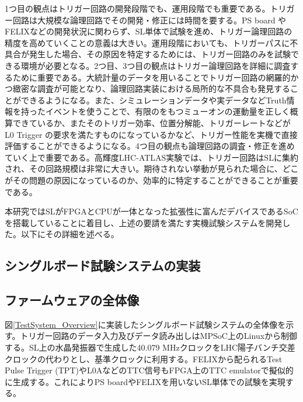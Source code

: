 1つ目の観点はトリガー回路の開発段階でも、運用段階でも重要である。トリガー回路は大規模な論理回路でその開発・修正には時間を要する。PS board や FELIXなどの開発状況に関わらず、SL単体で試験を進め、トリガー論理回路の精度を高めていくことの意義は大きい。運用段階においても、トリガーパスに不具合が発生した場合、その原因を特定するためには、トリガー回路のみを試験できる環境が必要となる。2つ目、3つ目の観点はトリガー論理回路を詳細に調査するために重要である。大統計量のデータを用いることでトリガー回路の網羅的かつ緻密な調査が可能となり、論理回路実装における局所的な不具合も発見することができるようになる。また、シミュレーションデータや実データなどTruth情報を持ったイベントを使うことで、有限の\pt をもつミューオンの運動量を正しく概算できているか、またそのトリガー効率、位置分解能、トリガーレートなどがL0 Trigger の要求を満たすものになっているかなど、トリガー性能を実機で直接評価することができるようになる。4つ目の観点も論理回路の調査・修正を進めていく上で重要である。高輝度LHC-ATLAS実験では、トリガー回路はSLに集約され、その回路規模は非常に大きい。期待されない挙動が見られた場合に、どこがその問題の原因になっているのか、効率的に特定することができることが重要である。

本研究ではSLがFPGAとCPUが一体となった拡張性に富んだデバイスであるSoCを搭載していることに着目し、上述の要請を満たす実機試験システムを開発した。以下にその詳細を述べる。

\subsection{シングルボード試験システムの実装}

\subsection*{ファームウェアの全体像}
\label{subsec_FirmwareOverview}

図\ref{TestSystem_Overview}に実装したシングルボード試験システムの全体像を示す。トリガー回路のデータ入力及びデータ読み出しはMPSoC上のLinuxから制御する。SL上の水晶発振器で生成した40.079 MHzクロックをLHC陽子バンチ交差クロックの代わりとし、基準クロックに利用する。FELIXから配られるTest Pulse Trigger (TPT)やL0AなどのTTC信号もFPGA上のTTC emulatorで擬似的に生成する。これによりPS boardやFELIXを用いないSL単体での試験を実現する。

